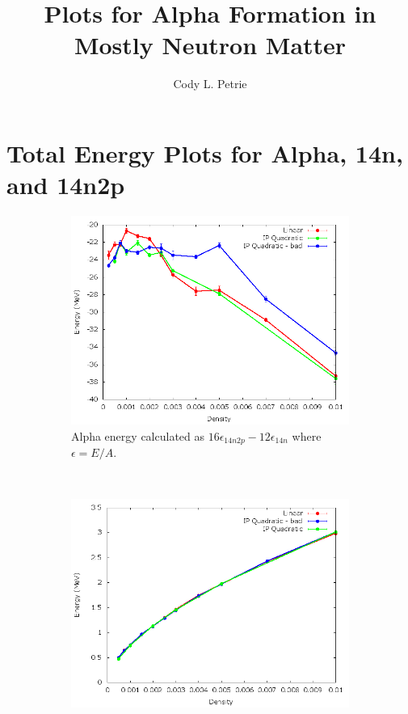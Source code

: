 \documentclass[12pt]{article}
\title{Plots for Alpha Formation in Mostly Neutron Matter}
\author{Cody L. Petrie}
\begin{document}
\maketitle
\tableofcontents
\newpage

\section{Total Energy Plots for Alpha, 14n, and 14n2p}
\begin{figure}[h!]
   \centering
   \begin{subfigure}{0.49\textwidth}
      \includegraphics[width=\textwidth]{../alpha_all.png}
      \caption{Alpha energy calculated as $16\epsilon_{14n2p}-12\epsilon_{14n}$ where $\epsilon=E/A$.}
   \end{subfigure}
   ~
   \begin{subfigure}{0.49\textwidth}
      \includegraphics[width=\textwidth]{../14n.png}

\end{subfigure}
\end{figure}
\end{document}
